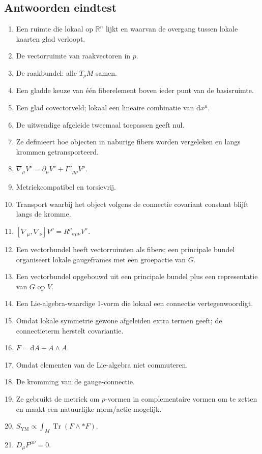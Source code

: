 \documentclass[11pt,a4paper]{article}
\newcommand{\dd}{\mathrm{d}}
\newcommand{\Tr}{\operatorname{Tr}}
\newcommand{\R}{\mathbb{R}}
\begin{document}
\subsection*{Antwoorden eindtest}
\begin{enumerate}
\item Een ruimte die lokaal op $\R^n$ lijkt en waarvan de overgang tussen lokale kaarten glad verloopt.
\item De vectorruimte van raakvectoren in $p$.
\item De raakbundel: alle $T_pM$ samen.
\item Een gladde keuze van één fiberelement boven ieder punt van de basisruimte.
\item Een glad covectorveld; lokaal een lineaire combinatie van $\dd x^\mu$.
\item De uitwendige afgeleide tweemaal toepassen geeft nul.
\item Ze definieert hoe objecten in naburige fibers worden vergeleken en langs krommen getransporteerd.
\item $\nabla_\mu V^\nu=\partial_\mu V^\nu+\Gamma^\nu{}_{\mu\rho}V^\rho$.
\item Metriekcompatibel en torsievrij.
\item Transport waarbij het object volgens de connectie covariant constant blijft langs de kromme.
\item $[\nabla_\mu,\nabla_\nu]V^\rho=R^\rho{}_{\sigma\mu\nu}V^\sigma$.
\item Een vectorbundel heeft vectorruimten als fibers; een principale bundel organiseert lokale gaugeframes met een groepactie van $G$.
\item Een vectorbundel opgebouwd uit een principale bundel plus een representatie van $G$ op $V$.
\item Een Lie-algebra-waardige 1-vorm die lokaal een connectie vertegenwoordigt.
\item Omdat lokale symmetrie gewone afgeleiden extra termen geeft; de connectieterm herstelt covariantie.
\item $F=\dd A+A\wedge A$.
\item Omdat elementen van de Lie-algebra niet commuteren.
\item De kromming van de gauge-connectie.
\item Ze gebruikt de metriek om $p$-vormen in complementaire vormen om te zetten en maakt een natuurlijke norm/actie mogelijk.
\item $S_{\mathrm{YM}}\propto\int_M\Tr(F\wedge*F)$.
\item $D_\mu F^{\mu\nu}=0$.

\end{enumerate}
\end{document}

